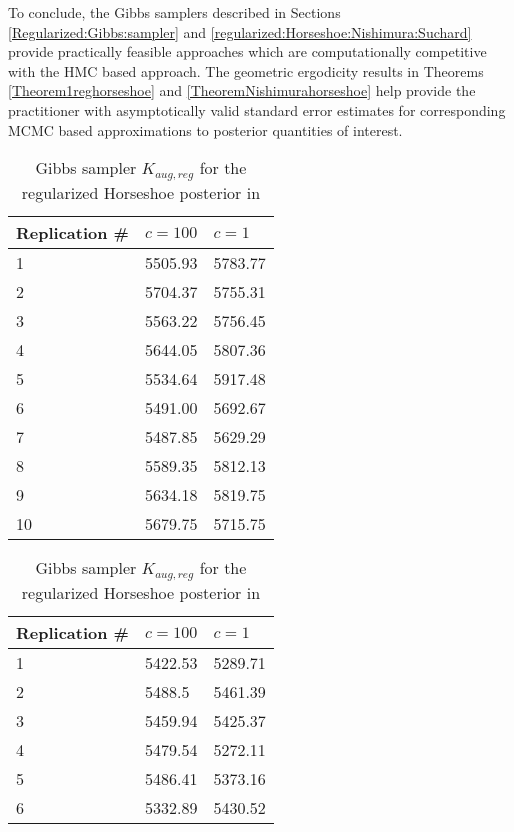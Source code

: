 \documentclass[noinfoline,11pt]{imsart}
\numberwithin{equation}{section}
\theoremstyle{plain}
\begin{document}
To conclude, the Gibbs samplers described in 
Sections \ref{Regularized:Gibbs:sampler} and 
\ref{regularized:Horseshoe:Nishimura:Suchard} provide practically feasible 
approaches which are computationally competitive with the HMC based approach. The 
geometric ergodicity results in 
Theorems \ref{Theorem1reghorseshoe} and \ref{TheoremNishimurahorseshoe} help provide the practitioner with asymptotically valid standard error estimates for corresponding MCMC based approximations to posterior quantities of interest. 
\begin{table}[hbt!]
    \begin{subtable}[h]{0.45\textwidth}
        \centering
        \begin{tabular}{| l | l | l |}
        \hline
        Replication \# & $c=100$ & $c=1$ \\
        \hline \hline
        1 & 5505.93 & 5783.77\\
        2 & 5704.37 & 5755.31\\
        3 & 5563.22 & 5756.45\\
        4 & 5644.05 & 5807.36\\
        5 & 5534.64 & 5917.48\\
        6 & 5491.00 & 5692.67\\
        7 & 5487.85 & 5629.29\\
        8 & 5589.35 & 5812.13\\
        9 & 5634.18 & 5819.75\\
       10 & 5679.75 & 5715.75\\
        \hline
       \end{tabular}
       \caption{Gibbs sampler $K_{aug, reg}$ for the regularized Horseshoe posterior in \cite{piironen2017}}
       \label{tab:week1}
    \end{subtable}
    \hfill
    \begin{subtable}[h]{0.45\textwidth}
        \centering
        \begin{tabular}{| l | l | l |}
        \hline
        Replication \# & $c=100$ & $c=1$ \\
        \hline \hline
        1 & 5422.53 & 5289.71\\
        2 & 5488.5  & 5461.39\\
        3 & 5459.94 & 5425.37\\
        4 & 5479.54 & 5272.11\\
        5 & 5486.41 & 5373.16\\
        6 & 5332.89 & 5430.52\\

\end{tabular}
\end{subtable}
\end{table}
\end{document}
